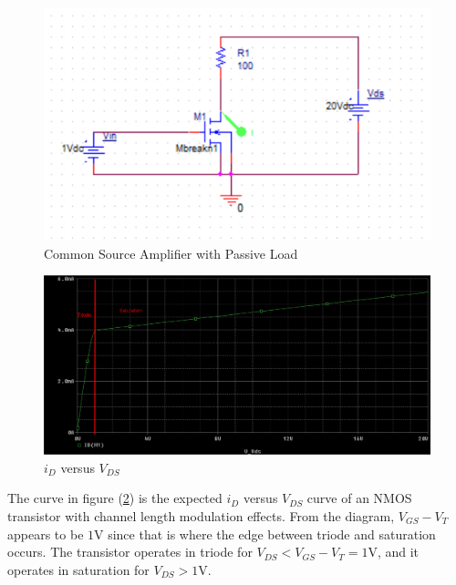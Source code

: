 \FloatBarrier

\begin{figure}[h!]
	\centering
	\includegraphics[scale=1]{../images/circuit1.PNG}
	\caption{Common Source Amplifier with Passive Load}
	\label{fig:circuit1}
\end{figure}

\FloatBarrier

\FloatBarrier

\begin{figure}[h!]
	\centering
	\includegraphics[scale=0.25]{../images/id_vs_vds.PNG}
	\caption{$i_D$ versus $V_{DS}$}
	\label{fig:id_vs_vds}
\end{figure}

\FloatBarrier

The curve in figure (\ref{fig:id_vs_vds}) is the expected $i_D$ versus $V_{DS}$ curve of an NMOS transistor with channel length modulation effects. From the diagram, $V_{GS} - V_T$ appears to be $1$\si{\volt} since that is where the edge between triode and saturation occurs. The transistor operates in triode for $V_{DS} < V_{GS} - V_T = 1$\si{\volt}, and it operates in saturation for $V_{DS} > 1$\si{\volt}.

